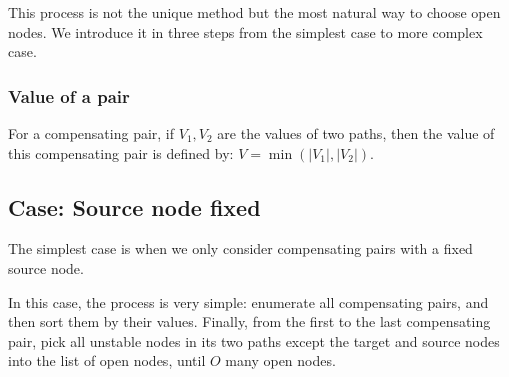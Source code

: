 \documentclass{llncs}
\begin{document}
This process is not the unique method but the most natural way to choose open nodes. We introduce it in three steps from the simplest case to more complex case.

\subsubsection*{Value of a pair}


For a compensating pair, if $V_1,V_2$ are the values of two paths, then the value of this compensating pair is defined by: $V=\min(|V_1|,|V_2|)$.


\subsection*{Case: Source node fixed}

The simplest case is when we only consider compensating pairs with a fixed source node. 

In this case, the process is very simple: enumerate all compensating pairs, and then sort them by their values. Finally, from the first to the last compensating pair, pick all unstable nodes in its two paths except the target and source nodes into the list of open nodes, until $O$ many open nodes. 
\end{document}
